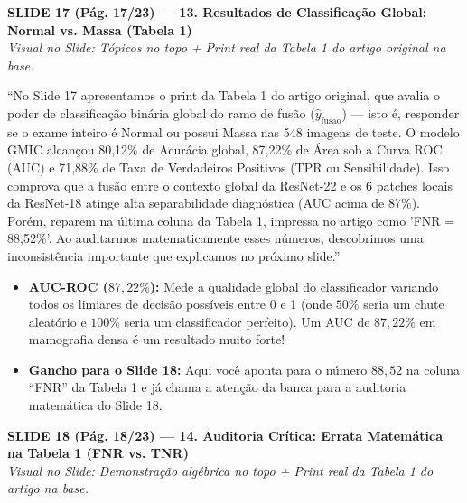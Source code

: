 \documentclass[11pt,a4paper]{article}
\newcommand{\slideheader}[3]{%
    \vspace{10pt}%
    \begin{tcolorbox}[colback=slateborder, colframe=slateborder, coltext=white, boxrule=0pt, arc=3pt, left=8pt, right=8pt, top=5pt, bottom=5pt]
        {\large\bfseries #1 — #2}\\[2pt]
        {\small\itshape Visual no Slide: #3}
    \end{tcolorbox}%
}
\newenvironment{falabox}{%
    \begin{tcolorbox}[colback=speechbg, colframe=speechborder, boxrule=1.2pt, arc=4pt, left=10pt, right=10pt, top=8pt, bottom=8pt, title={\bfseries O QUE VOCÊ DEVE FALAR (Fala Sugerida)}]%
}{%
    \end{tcolorbox}%
}
\newenvironment{explicabox}{%
    \begin{tcolorbox}[colback=explainbg, colframe=explainborder, boxrule=0.8pt, arc=4pt, left=10pt, right=10pt, top=8pt, bottom=8pt, title={\bfseries ENTENDA O QUE VOCÊ ESTÁ FALANDO (Explicação Didática de Cada Termo)}]%
}{%
    \end{tcolorbox}%
}
\begin{document}
\newpage
\slideheader{SLIDE 17 (Pág. 17/23)}{13. Resultados de Classificação Global: Normal vs. Massa (Tabela 1)}{Tópicos no topo + Print real da Tabela 1 do artigo original na base.}

\begin{falabox}
``No Slide 17 apresentamos o print da Tabela 1 do artigo original, que avalia o poder de classificação binária global do ramo de fusão ($\hat{y}_{\text{fusao}}$) — isto é, responder se o exame inteiro é Normal ou possui Massa nas 548 imagens de teste. O modelo GMIC alcançou 80,12\% de Acurácia global, 87,22\% de Área sob a Curva ROC (AUC) e 71,88\% de Taxa de Verdadeiros Positivos (TPR ou Sensibilidade). Isso comprova que a fusão entre o contexto global da ResNet-22 e os 6 patches locais da ResNet-18 atinge alta separabilidade diagnóstica (AUC acima de 87\%). Porém, reparem na última coluna da Tabela 1, impressa no artigo como 'FNR = 88,52\%'. Ao auditarmos matematicamente esses números, descobrimos uma inconsistência importante que explicamos no próximo slide.''
\end{falabox}

\begin{explicabox}
\begin{itemize}[leftmargin=*, itemsep=4pt]
    \item \textbf{AUC-ROC ($87{,}22\%$):} Mede a qualidade global do classificador variando todos os limiares de decisão possíveis entre 0 e 1 (onde $50\%$ seria um chute aleatório e $100\%$ seria um classificador perfeito). Um AUC de $87{,}22\%$ em mamografia densa é um resultado muito forte!
    \item \textbf{Gancho para o Slide 18:} Aqui você aponta para o número $88{,}52$ na coluna ``FNR'' da Tabela 1 e já chama a atenção da banca para a auditoria matemática do Slide 18.
\end{itemize}
\end{explicabox}

\newpage
\slideheader{SLIDE 18 (Pág. 18/23)}{14. Auditoria Crítica: Errata Matemática na Tabela 1 (FNR vs. TNR)}{Demonstração algébrica no topo + Print real da Tabela 1 do artigo na base.}
\end{document}
